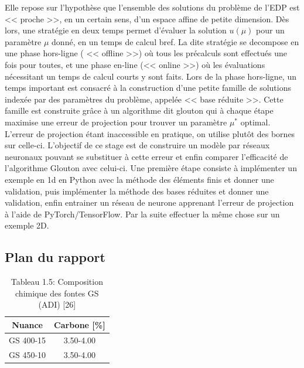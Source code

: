 \documentclass[12pt]{article}
\begin{document}
Elle repose sur l'hypothèse que l'ensemble des solutions du problème de l'EDP est << proche >>, en un certain sens, d'un espace affine de petite dimension.
Dès lors, une stratégie en deux temps permet d'évaluer la solution $u(\mu)$ pour un paramètre $\mu$ donné, en un temps de calcul bref.
La dite stratégie se decompose en une phase hors-ligne ( << offline >>) où tous les précalculs sont effectués une fois pour toutes, et une phase en-line (<< online >>) où les évaluations nécessitant un temps de calcul courts y sont faits.
Lors de la phase hors-ligne, un temps important est consacré à la construction d'une petite famille de solutions indexée par des paramètres du problème, appelée << base réduite >>.
Cette famille est construite grâce à un algorithme dit glouton qui à chaque étape maximise une erreur de projection pour trouver un paramètre $\mu^*$ optimal.
L'erreur de projection étant inaccessible en pratique, on utilise plutôt des bornes sur celle-ci.
L'objectif de ce stage est de construire un modèle par réseaux neuronaux pouvant se substituer à cette erreur et enfin comparer l'efficacité de l'algorithme Glouton avec celui-ci. Une première étape consiste à implémenter un exemple en 1d en Python avec la méthode des éléments finis et donner une validation, puis implémenter la méthode des bases réduites et donner une validation, enfin entrainer un réseau de neurone apprenant l'erreur de projection à l'aide de PyTorch/TensorFlow. Par la suite effectuer la même chose sur un exemple 2D.






\subsection{Plan du rapport }

\begin{table}[H]
    \caption{Tableau 1.5: Composition chimique des fontes GS (ADI) [26]}
    \centering
        \begin{tabular}{|c|c|}
        \hline
        Nuance & Carbone [\%] \\ \hline
        GS 400-15 & 3.50-4.00  \\ \hline
        GS 450-10 & 3.50-4.00  \\ \hline
        \end{tabular}
\end{table}
    
\end{document}
